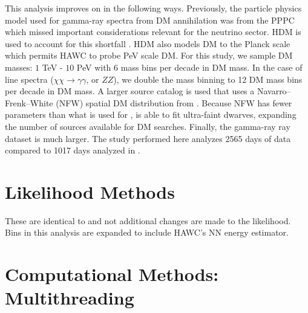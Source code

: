 This analysis improves on  in the following ways.
Previously, the particle physics model used for gamma-ray spectra from DM annihilation was from the PPPC \cite{Cirelli_2011} which missed important considerations relevant for the neutrino sector.
HDM is used to account for this shortfall \cite{HDMSpectra}.
HDM also models DM to the Planck scale which permits HAWC to probe PeV scale DM.
For this study, we sample DM masses: $1$ TeV - $10$ PeV with 6 mass bins per decade in DM mass.
In the case of line spectra ($\chi\chi \rightarrow \gamma\gamma$, or $ZZ$), we double the mass binning to 12 DM mass bins per decade in DM mass.
A larger source catalog is used that uses a Navarro–Frenk–White (NFW) spatial DM distribution from \LS \cite{DM_Strigari20}.
Because NFW has fewer parameters than what is used for \GS, \LS is able to fit ultra-faint dwarves, expanding the number of sources available for DM searches.
Finally, the gamma-ray ray dataset is much larger.
The study performed here analyzes 2565 days of data compared to 1017 days analyzed in .

\section{Likelihood Methods} \label{sec:mtd_ll_methods}

These are identical to  and not additional changes are made to the likelihood.
Bins in this analysis are expanded to include HAWC's NN energy estimator.

\section{Computational Methods: Multithreading} \label{sec:mtd_comp_methods}

